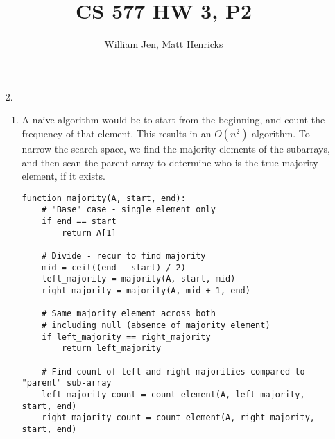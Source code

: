 \documentclass{article}
\title{\large CS 577 HW 3, P2}
\author{\normalsize William Jen, Matt Henricks}
\date{}
\begin{document}
\maketitle

\begin{enumerate}
    \item[2.]
        \begin{enumerate}
            \item A naive algorithm would be to start from the beginning, and count the frequency of that
                element. This results in an $O\left(n^2\right)$ algorithm. To narrow the search space, we find
                the majority elements of the subarrays, and then scan the parent array to determine who is
                the true majority element, if it exists.
            \begin{multicols}{2}
                \begin{verbatim}
function majority(A, start, end):
    # "Base" case - single element only
    if end == start
        return A[1]
        
    # Divide - recur to find majority 
    mid = ceil((end - start) / 2)
    left_majority = majority(A, start, mid)
    right_majority = majority(A, mid + 1, end)
    
    # Same majority element across both
    # including null (absence of majority element)
    if left_majority == right_majority
        return left_majority

    # Find count of left and right majorities compared to "parent" sub-array
    left_majority_count = count_element(A, left_majority, start, end)
    right_majority_count = count_element(A, right_majority, start, end)
    

\end{verbatim}
\end{multicols}
\end{enumerate}
\end{enumerate}
\end{document}
